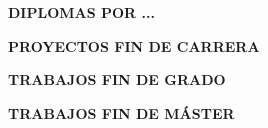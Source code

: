
\cleardoublepage
\vspace*{10cm}
\uppercase{\textbf{Diplomas por ...}}\\

\cleardoublepage


\cleardoublepage
\vspace*{10cm}
\uppercase{\textbf{Proyectos Fin de Carrera}}
\cleardoublepage


\cleardoublepage
\vspace*{10cm}
\uppercase{\textbf{Trabajos Fin de Grado}}
\cleardoublepage


\cleardoublepage
\vspace*{10cm}
\uppercase{\textbf{Trabajos Fin de Máster}}
\cleardoublepage

